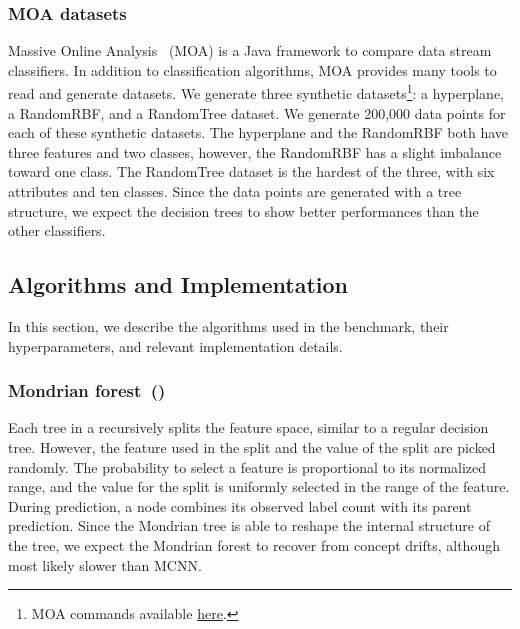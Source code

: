 \subsubsection{MOA datasets}
Massive Online Analysis~\cite{moa} (MOA) is a Java framework to compare
data stream classifiers. In addition to classification algorithms, MOA provides many
tools to read and generate datasets.
We generate three synthetic datasets\footnote{MOA commands available \href{https://github.com/azazel7/paper-benchmark/blob/e0c9a94d0d17490f7ab14293dec20b8322a6447c/Makefile\#L90}{here}.}:
a hyperplane, a RandomRBF, and a RandomTree
dataset. We generate 200,000 data points
 for each of these synthetic datasets.
The hyperplane and the RandomRBF both have three features and two classes, however, the RandomRBF has a slight imbalance toward one class.
The RandomTree dataset is the hardest of the three, with six attributes and
ten classes. Since the data points are generated with a tree structure, we
expect the decision trees to show better performances than the other
classifiers.

\subsection{Algorithms and Implementation}
In this section, we describe the algorithms used in the benchmark, their
hyperparameters, and relevant implementation details. 

\subsubsection{Mondrian forest~(\mondrianforest)~\cite{mondrian2014}}
Each tree in a \mondrianforest recursively splits the feature space, similar to
a regular decision tree.  However, the feature used in the split and the value
of the split are picked randomly. The probability to select a feature is
proportional to its normalized range, and the value for the split is uniformly
selected in the range of the feature.  During prediction, a node combines its
observed label count with its parent prediction. Since the Mondrian tree is able
to reshape the internal structure of the tree, we expect the Mondrian forest to
recover from concept drifts, although most likely slower than MCNN.

